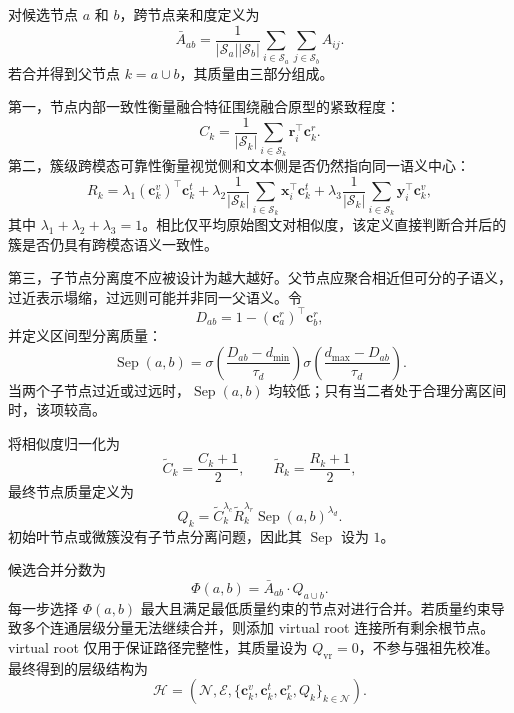 对候选节点 $a$ 和 $b$，跨节点亲和度定义为
\begin{equation}
    \bar{A}_{ab}
    =
    \frac{1}{|\mathcal{S}_a||\mathcal{S}_b|}
    \sum_{i\in\mathcal{S}_a}
    \sum_{j\in\mathcal{S}_b}
    A_{ij}.
\end{equation}
若合并得到父节点 $k=a\cup b$，其质量由三部分组成。

第一，节点内部一致性衡量融合特征围绕融合原型的紧致程度：
\begin{equation}
    C_k=
    \frac{1}{|\mathcal{S}_k|}
    \sum_{i\in\mathcal{S}_k}
    \boldsymbol{r}_i^{\top}\boldsymbol{c}_k^r.
\end{equation}
第二，簇级跨模态可靠性衡量视觉侧和文本侧是否仍然指向同一语义中心：
\begin{equation}
    R_k=
    \lambda_1(\boldsymbol{c}_k^v)^{\top}\boldsymbol{c}_k^t
    +
    \lambda_2
    \frac{1}{|\mathcal{S}_k|}
    \sum_{i\in\mathcal{S}_k}
    \boldsymbol{x}_i^{\top}\boldsymbol{c}_k^t
    +
    \lambda_3
    \frac{1}{|\mathcal{S}_k|}
    \sum_{i\in\mathcal{S}_k}
    \boldsymbol{y}_i^{\top}\boldsymbol{c}_k^v,
\end{equation}
其中 $\lambda_1+\lambda_2+\lambda_3=1$。相比仅平均原始图文对相似度，该定义直接判断合并后的簇是否仍具有跨模态语义一致性。

第三，子节点分离度不应被设计为越大越好。父节点应聚合相近但可分的子语义，过近表示塌缩，过远则可能并非同一父语义。令
\begin{equation}
    D_{ab}=1-(\boldsymbol{c}_a^r)^{\top}\boldsymbol{c}_b^r,
\end{equation}
并定义区间型分离质量：
\begin{equation}
    \operatorname{Sep}(a,b)
    =
    \sigma\left(\frac{D_{ab}-d_{\min}}{\tau_d}\right)
    \sigma\left(\frac{d_{\max}-D_{ab}}{\tau_d}\right).
\end{equation}
当两个子节点过近或过远时，$\operatorname{Sep}(a,b)$ 均较低；只有当二者处于合理分离区间时，该项较高。

将相似度归一化为
\begin{equation}
    \tilde{C}_k=\frac{C_k+1}{2},\qquad
    \tilde{R}_k=\frac{R_k+1}{2},
\end{equation}
最终节点质量定义为
\begin{equation}
    Q_k=
    \tilde{C}_k^{\lambda_c}
    \tilde{R}_k^{\lambda_r}
    \operatorname{Sep}(a,b)^{\lambda_d}.
\end{equation}
初始叶节点或微簇没有子节点分离问题，因此其 $\operatorname{Sep}$ 设为 $1$。

候选合并分数为
\begin{equation}
    \Phi(a,b)=\bar{A}_{ab}\cdot Q_{a\cup b}.
\end{equation}
每一步选择 $\Phi(a,b)$ 最大且满足最低质量约束的节点对进行合并。若质量约束导致多个连通层级分量无法继续合并，则添加 virtual root 连接所有剩余根节点。virtual root 仅用于保证路径完整性，其质量设为 $Q_{\mathrm{vr}}=0$，不参与强祖先校准。最终得到的层级结构为
\begin{equation}
    \mathcal{H}=(\mathcal{N},\mathcal{E},\{\boldsymbol{c}_k^v,\boldsymbol{c}_k^t,\boldsymbol{c}_k^r,Q_k\}_{k\in\mathcal{N}}).
\end{equation}

